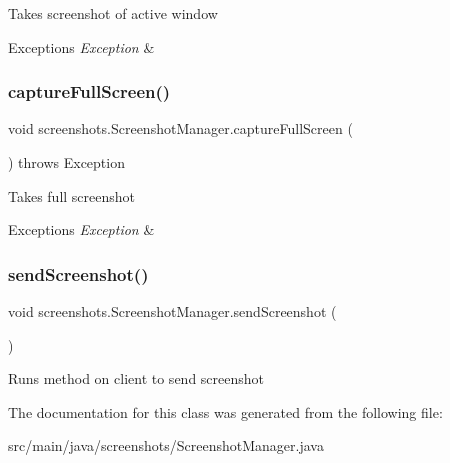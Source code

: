 Takes screenshot of active window 
\begin{DoxyExceptions}{Exceptions}
{\em Exception} & \\
\hline
\end{DoxyExceptions}
\mbox{\label{classscreenshots_1_1_screenshot_manager_aed584aa559396b79c563fc1265db9d71}} 
\subsubsection{\texorpdfstring{capture\+Full\+Screen()}{captureFullScreen()}}
{\footnotesize\ttfamily void screenshots.\+Screenshot\+Manager.\+capture\+Full\+Screen (\begin{DoxyParamCaption}{ }\end{DoxyParamCaption}) throws Exception}

Takes full screenshot 
\begin{DoxyExceptions}{Exceptions}
{\em Exception} & \\
\hline
\end{DoxyExceptions}
\mbox{\label{classscreenshots_1_1_screenshot_manager_ad0da7ac637dba41b46e45487dc92e87b}} 
\subsubsection{\texorpdfstring{send\+Screenshot()}{sendScreenshot()}}
{\footnotesize\ttfamily void screenshots.\+Screenshot\+Manager.\+send\+Screenshot (\begin{DoxyParamCaption}{ }\end{DoxyParamCaption})}

Runs method on client to send screenshot 

The documentation for this class was generated from the following file\+:\begin{DoxyCompactItemize}
\item 
src/main/java/screenshots/Screenshot\+Manager.\+java\end{DoxyCompactItemize}
